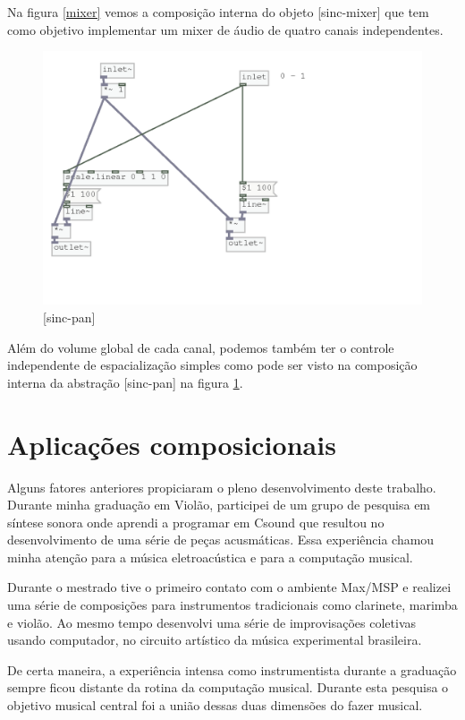 \documentclass{ppgmus}
\begin{document}
Na figura \ref{mixer} vemos a composição interna do objeto
[sinc-mixer] que tem como objetivo implementar um mixer
de áudio de quatro canais independentes.

\begin{figure}
\includegraphics[scale=.6]{pan}
\caption{[sinc-pan]}
\label{pan}
\end{figure}

Além do volume global de cada canal, podemos também ter o controle
independente de espacialização simples como pode ser visto
na composição interna da abstração [sinc-pan] na figura \ref{pan}.

\chapter{Aplicações composicionais}
\label{composicao}

Alguns fatores anteriores propiciaram o pleno desenvolvimento
deste trabalho. Durante minha graduação em Violão, participei
de um grupo de pesquisa em síntese sonora onde aprendi a programar
em Csound que resultou no desenvolvimento de uma série de peças acusmáticas. 
Essa experiência chamou minha atenção para a música
eletroacústica e para a computação musical. 

Durante o mestrado tive o primeiro contato com o ambiente
Max/MSP e realizei uma série de composições para instrumentos
tradicionais como clarinete, marimba e violão. Ao mesmo tempo
desenvolvi uma série de improvisações coletivas usando computador,
no circuito artístico da música experimental brasileira.

De certa maneira, a experiência intensa como instrumentista
durante a graduação sempre ficou distante da rotina da
computação musical. Durante esta pesquisa o objetivo musical central 
foi a união dessas duas dimensões do fazer musical.
\end{document}
